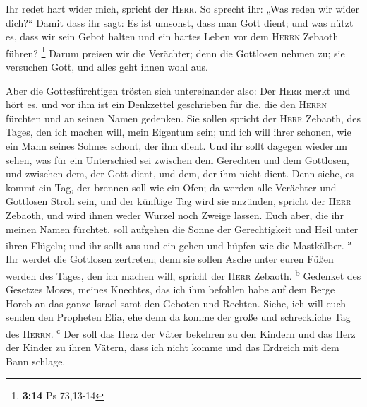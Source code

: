  Ihr redet hart wider mich, spricht der \textsc{Herr}. So
sprecht ihr: „Was reden wir wider dich?{}``  Damit dass
ihr sagt: Es ist umsonst, dass man Gott dient; und was nützt es, dass
wir sein Gebot halten und ein hartes Leben vor dem \textsc{Herrn}
Zebaoth führen? \footnote{\textbf{3:14} Ps 73,13-14} 
Darum preisen wir die Verächter; denn die Gottlosen nehmen zu; sie
versuchen Gott, und alles geht ihnen wohl aus.

 Aber die Gottesfürchtigen trösten sich untereinander
also: Der \textsc{Herr} merkt und hört es, und vor ihm ist ein
Denkzettel geschrieben für die, die den \textsc{Herrn} fürchten und an
seinen Namen gedenken.  Sie sollen spricht der
\textsc{Herr} Zebaoth, des Tages, den ich machen will, mein Eigentum
sein; und ich will ihrer schonen, wie ein Mann seines Sohnes schont, der
ihm dient.  Und ihr sollt dagegen wiederum sehen, was für
ein Unterschied sei zwischen dem Gerechten und dem Gottlosen, und
zwischen dem, der Gott dient, und dem, der ihm nicht dient.
 Denn siehe, es kommt ein Tag, der brennen soll wie ein
Ofen; da werden alle Verächter und Gottlosen Stroh sein, und der
künftige Tag wird sie anzünden, spricht der \textsc{Herr} Zebaoth, und
wird ihnen weder Wurzel noch Zweige lassen.  Euch aber,
die ihr meinen Namen fürchtet, soll aufgehen die Sonne der Gerechtigkeit
und Heil unter ihren Flügeln; und ihr sollt aus und ein gehen und hüpfen
wie die Mastkälber. \textsuperscript{a}  Ihr werdet die
Gottlosen zertreten; denn sie sollen Asche unter euren Füßen werden des
Tages, den ich machen will, spricht der \textsc{Herr} Zebaoth.
\textsuperscript{b}  Gedenket des Gesetzes Moses, meines
Knechtes, das ich ihm befohlen habe auf dem Berge Horeb an das ganze
Israel samt den Geboten und Rechten.  Siehe, ich will
euch senden den Propheten Elia, ehe denn da komme der große und
schreckliche Tag des \textsc{Herrn}. \textsuperscript{c} 
Der soll das Herz der Väter bekehren zu den Kindern und das Herz der
Kinder zu ihren Vätern, dass ich nicht komme und das Erdreich mit dem
Bann schlage.
